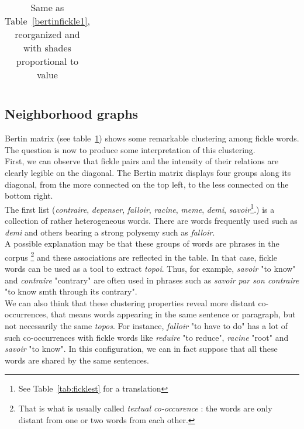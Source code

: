 \documentclass[preprint]{elsarticle}
\begin{document}
\begin{table}[h!]
{\begin{tabular}{|p{2pt}l|*{30}{c|}}
\end{tabular}
}
\caption{Same as Table~\ref{bertinfickle1}, reorganized and with shades proportional to value}
\label{bertin4}
\end{table}

\subsection{Neighborhood graphs}

Bertin matrix (see table~\ref{bertin4}) shows some remarkable clustering among fickle words. The question is now to produce some interpretation of this clustering.\\

First, we can observe that fickle pairs and the intensity of their relations are clearly legible on the diagonal. The Bertin matrix displays four groups along its diagonal, from the more connected on the top left, to the less connected on the bottom right.\\

The first list (\textit{contraire}, \textit{depenser}, \textit{falloir}, \textit{racine}, \textit{meme}, \textit{demi}, \textit{savoir}\footnote{See Table~\ref{tab:ficklest} for a translation}.) is a collection of rather heterogeneous words. There are words frequently used such as \textit{demi} and others bearing a strong polysemy such as \textit{falloir}.\\
 
A possible explanation may be that these groups of words are phrases in the corpus \footnote{That is what is usually called \textit{textual co-occurence} : the words are only distant from one or two words from each other.} and these associations are reflected in the table. In that case, fickle words can be used as a tool to extract \textit{topoi}. Thus, for example, \textit{savoir} "to know" and \textit{contraire} "contrary" are often used in phrases such as \textit{savoir par son contraire} "to know smth through its contrary".\\

We can also think that these clustering properties reveal more distant co-occurrences, that means words appearing in the same sentence or paragraph, but not necessarily the same \textit{topos}. For instance, \textit{falloir} "to have to do" has a lot of such co-occurrences with fickle words like \textit{reduire} "to reduce", \textit{racine} "root" and \textit{savoir} "to know". In this configuration, we can in fact suppose that all these words are shared by the same sentences.\\
\end{document}
